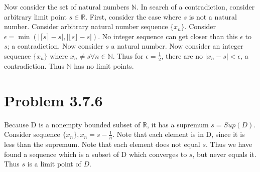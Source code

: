 \documentclass[10pt]{article} %
\begin{document}
Now consider the set of natural numbers $\mathbb{N}$. In search of a contradiction, consider arbitrary limit point $s \in \mathbb{R}$. First, consider the case where $s$ is not a natural number. Consider arbitrary natural number sequence $\{x_n\}$. Consider $\epsilon = \min\left(|\lceil{s}\rceil-s|, |\lfloor{s}\rfloor-s|\right)$. No integer sequence can get closer than this $\epsilon$ to $s$; a contradiction. Now consider $s$ a natural number. Now consider an integer sequence $\{x_n\}$ where $x_n \neq s \forall n\in\mathbb{N}$. Thus for $\epsilon=\frac12$, there are no $|x_n-s|<\epsilon$, a contradiction. Thus $\mathbb{N}$ has no limit points.\\

\section{Problem 3.7.6}
Because D is a nonempty bounded subset of $\mathbb{R}$, it has a supremum $s=Sup(D)$. Consider sequence $\{x_n\}, x_n = s-\frac{1}{n}$. Note that each element is in D, since it is less than the supremum. Note that each element does not equal $s$. Thus we have found a sequence which is a subset of D which converges to $s$, but never equals it. Thus $s$ is a limit point of $D$.\\
\end{document}
